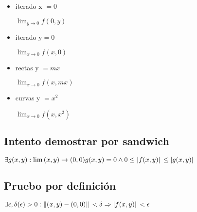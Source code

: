 \documentclass[../parcial.tex]{subfiles}
\begin{document}
\begin{enumerate}
            \begin{itemize}
                \item iterado x $= 0$

                    $\lim_{y\to0} f(0,y)$

                \item iterado y$= 0$

                    $\lim_{x\to0} f(x,0)$

                \item rectas y $= mx$
                
                    $\lim_{x\to0} f(x,mx)$

                \item curvas y $= x^2$

                    $\lim_{x\to0} f(x,x^2)$

            \end{itemize}

            \subsection*{Intento demostrar por sandwich}
        
            $ \exists g(x,y): \lim{(x,y)\to(0,0)} g(x,y) = 0 \wedge 0 \leq \abs*{f(x,y)} \leq \abs*{g(x,y)} $
        
            \subsection*{Pruebo por definición}

            $ \exists \epsilon,\delta(\epsilon) > 0 : \norm*{(x,y) - (0,0)} < \delta \Rightarrow \abs*{f(x,y)} < \epsilon $

    \end{enumerate}
\end{document}
